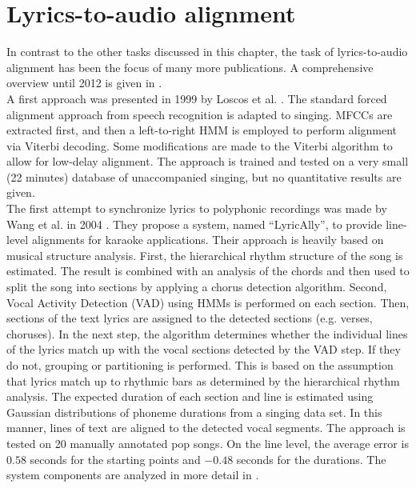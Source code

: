 \section{Lyrics-to-audio alignment}
In contrast to the other tasks discussed in this chapter, the task of lyrics-to-audio alignment has been the focus of many more publications. A comprehensive overview until 2012 is given in \cite{goto_alignment}.\\
A first approach was presented in 1999 by Loscos et al. \cite{loscos}. The standard forced alignment approach from speech recognition is adapted to singing. MFCCs are extracted first, and then a left-to-right HMM is employed to perform alignment via Viterbi decoding. Some modifications are made to the Viterbi algorithm to allow for low-delay alignment. The approach is trained and tested on a very small (22 minutes) database of unaccompanied singing, but no quantitative results are given.\\
The first attempt to synchronize lyrics to polyphonic recordings was made by Wang et al. in 2004 \cite{Wang2004}. They propose a system, named ``LyricAlly'', to provide line-level alignments for karaoke applications. Their approach is heavily based on musical structure analysis. First, the hierarchical rhythm structure of the song is estimated. The result is combined with an analysis of the chords and then used to split the song into sections by applying a chorus detection algorithm. Second, Vocal Activity Detection (VAD) using HMMs is performed on each section. Then, sections of the text lyrics are assigned to the detected sections (e.g. verses, choruses). In the next step, the algorithm determines whether the individual lines of the lyrics match up with the vocal sections detected by the VAD step. If they do not, grouping or partitioning is performed. This is based on the assumption that lyrics match up to rhythmic bars as determined by the hierarchical rhythm analysis. The expected duration of each section and line is estimated using Gaussian distributions of phoneme durations from a singing data set. In this manner, lines of text are aligned to the detected vocal segments. The approach is tested on 20 manually annotated pop songs. On the line level, the average error is $0.58$ seconds for the starting points and $-0.48$ seconds for the durations. The system components are analyzed in more detail in \cite{lyrically}.\\
